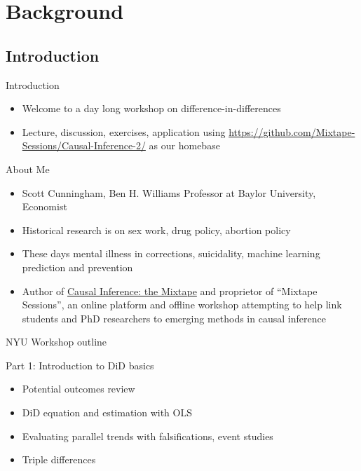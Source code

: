 \documentclass{beamer}
\begin{document}



\section{Background}

\subsection{Introduction}

\begin{frame}{Introduction}

\begin{itemize}
\item Welcome to a day long workshop on difference-in-differences 
\item Lecture, discussion, exercises, application using \url{https://github.com/Mixtape-Sessions/Causal-Inference-2/} as our homebase
\end{itemize}

\end{frame}

\begin{frame}{About Me}

\begin{itemize}
\item Scott Cunningham, Ben H. Williams Professor at Baylor University, Economist
\item Historical research is on sex work, drug policy, abortion policy
\item These days mental illness in corrections, suicidality, machine learning prediction and prevention
\item Author of \underline{Causal Inference: the Mixtape} and proprietor of ``Mixtape Sessions'', an online platform and offline workshop attempting to help link students and PhD researchers to emerging methods in causal inference
\end{itemize}

\end{frame}



\begin{frame}{NYU Workshop outline}

Part 1: Introduction to DiD basics 
	\begin{itemize}
	\item Potential outcomes review
	\item DiD equation and estimation with OLS
	\item Evaluating parallel trends with falsifications, event studies 
	\item Triple differences
	\end{itemize}

\end{frame}
\end{document}
